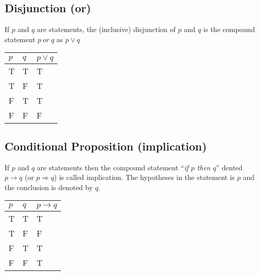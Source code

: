 \subsection{Disjunction (or)}
If $p$ and $q$ are statements, the (inclusive) disjunction of $p$ and $q$ is the compound statement $p\ or\ q$ as $p \vee q$
\begin{table}[H]
    \centering
    \begin{tabular}{C{0.1\textwidth} C{0.1\textwidth} C{0.1\textwidth}}
        $p$ & $q$ & $p \vee q$\\
        \hline
        \hline
        T & T & T\\
        \hline
        T & F & T \\
        \hline
        F & T & T \\
        \hline
        F & F & F\\
        \hline
    \end{tabular}
\end{table}

\subsection{Conditional Proposition (implication)}
If $p$ and $q$ are statements then the compound statement ``\textit{if $p$ then $q$}'' dented $p \rightarrow q$ (or $p \Rightarrow q$) is called implication. The hypotheses in the statement is $p$ and the conclusion is denoted by $q$.

\begin{table}[H]
    \centering
    \begin{tabular}{C{0.1\textwidth} C{0.1\textwidth} C{0.1\textwidth}}
        $p$ & $q$ & $p \rightarrow q$\\
        \hline
        \hline
        T & T & T\\
        \hline
        T & F & F \\
        \hline
        F & T & T \\
        \hline
        F & F & T\\
        \hline
    \end{tabular}
\end{table}


